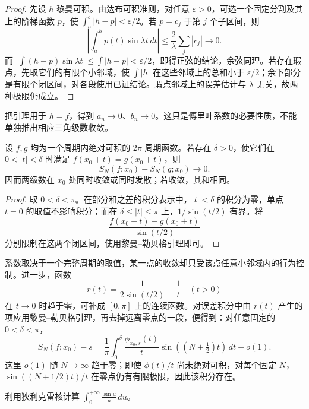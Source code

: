 \begin{proof}
先设 $h$ 黎曼可积。由达布可积准则，对任意 $\varepsilon>0$，可选一个固定分割及其上的阶梯函数 $p$，使 $\int_a^b|h-p|<\varepsilon/2$。若 $p=c_j$ 于第 $j$ 个子区间，则
\[
    \left|\int_a^bp(t)\sin\lambda t\,dt\right|
        \leq\frac2\lambda\sum_j|c_j|\longrightarrow0.
\]
而 $|\int(h-p)\sin\lambda t|\leq\int|h-p|<\varepsilon/2$，即得正弦的结论，余弦同理。若存在瑕点，先取它们的有限个小邻域，使 $\int|h|$ 在这些邻域上的总和小于 $\varepsilon/2$；余下部分是有限个闭区间，对各段使用已证结论。瑕点邻域上的误差估计与 $\lambda$ 无关，故两种极限仍成立。
\end{proof}

把引理用于 $h=f$，得到 $a_n\to0$、$b_n\to0$。这只是傅里叶系数的必要性质，不能单独推出相应三角级数收敛。

\begin{theorem}[黎曼局部化定理]
\label{thm:riemann-localization-fourier}
设 $f,g$ 均为一个周期内绝对可积的 $2\pi$ 周期函数。若存在 $\delta>0$，使它们在 $0<|t|<\delta$ 时满足 $f(x_0+t)=g(x_0+t)$，则
\[
    S_N(f;x_0)-S_N(g;x_0)\longrightarrow0.
\]
因而两级数在 $x_0$ 处同时收敛或同时发散；若收敛，其和相同。
\end{theorem}

\begin{proof}
取 $0<\delta<\pi$。在部分和之差的积分表示中，$|t|<\delta$ 的积分为零，单点 $t=0$ 的取值不影响积分；而在 $\delta\leq|t|\leq\pi$ 上，$1/\sin(t/2)$ 有界。将
\[
    \frac{f(x_0+t)-g(x_0+t)}{\sin(t/2)}
\]
分别限制在这两个闭区间，使用黎曼--勒贝格引理即可。
\end{proof}

系数取决于一个完整周期的取值，某一点的收敛却只受该点任意小邻域内的行为控制。进一步，函数
\[
    r(t)=\frac1{2\sin(t/2)}-\frac1t\quad(t>0)
\]
在 $t\to0$ 时趋于零，可补成 $[0,\pi]$ 上的连续函数。对误差积分中由 $r(t)$ 产生的项应用黎曼--勒贝格引理，再去掉远离零点的一段，便得到：对任意固定的 $0<\delta<\pi$，
\begin{equation}
    S_N(f;x_0)-s
       =\frac1\pi\int_0^\delta
           \frac{\phi_{x_0,s}(t)}t
                  \sin((N+\tfrac12)t)\,dt+o(1).
    \label{eq:localized-fourier-error}
\end{equation}
这里 $o(1)$ 随 $N\to\infty$ 趋于零；即使 $\phi(t)/t$ 尚未绝对可积，对每个固定 $N$，$\sin((N+1/2)t)/t$ 在零点仍有有限极限，因此该积分存在。

\begin{example}
\label{ex:dirichlet-sine-integral-value}
利用狄利克雷核计算 $\displaystyle\int_0^{+\infty}\frac{\sin u}{u}\,du$。
\end{example}

